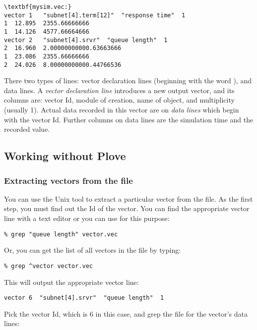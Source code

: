 \begin{Verbatim}[commandchars=\\\{\}]
\textbf{mysim.vec:}
vector 1   "subnet[4].term[12]"  "response time"  1
1  12.895  2355.66666666
1  14.126  4577.66664666
vector 2   "subnet[4].srvr"  "queue length"  1
2  16.960  2.00000000000.63663666
1  23.086  2355.66666666
2  24.026  8.00000000000.44766536
\end{Verbatim}


There two types of lines: vector declaration lines (beginning with
the word ), and data lines.
A \textit{vector declaration line} introduces a new output vector, and
its columns are: vector Id, module of creation, name of 
object, and multiplicity (usually 1). Actual data recorded in this
vector are on \textit{data lines} which begin with the vector Id.
Further columns on data lines are the simulation time and the recorded value.




\subsection{Working without Plove}

\subsubsection{Extracting vectors from the file}

You can use the Unix  tool to extract a particular vector
from the file. As the first step, you must find out the Id of the
vector. You can find the appropriate vector line with a text editor or
you can use  for this purpose:

\begin{verbatim}
% grep "queue length" vector.vec
\end{verbatim}

Or, you can get the list of all vectors in the file by typing:

\begin{verbatim}
% grep ^vector vector.vec
\end{verbatim}

This will output the appropriate vector line:

\begin{verbatim}
vector 6  "subnet[4].srvr"  "queue length"  1
\end{verbatim}

Pick the vector Id, which is 6 in this case, and grep the file
for the vector's data lines:

